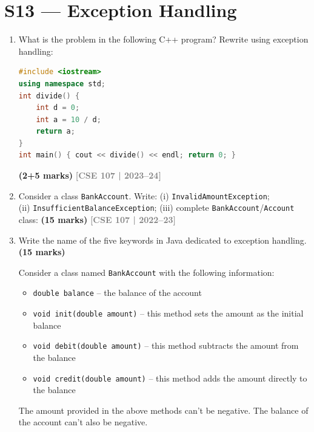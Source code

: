 \documentclass[12pt,a3paper]{article}
\newcommand{\yr}[1]{\hfill\textcolor{gray}{\small\textbf{[#1]}}}
\newcommand{\mk}[1]{\textcolor{orange!70!black}{\small\textbf{(#1 marks)}}}
\begin{document}
\section{S13 --- Exception Handling}

\begin{enumerate}
\item What is the problem in the following C++ program? Rewrite using exception handling:
\begin{lstlisting}[language=C++]
#include <iostream>
using namespace std;
int divide() {
    int d = 0;
    int a = 10 / d;
    return a;
}
int main() { cout << divide() << endl; return 0; }
\end{lstlisting}
\mk{2+5}
\yr{CSE 107 | 2023--24}







\item Consider a class \texttt{BankAccount}. Write: (i) \texttt{InvalidAmountException};\\ (ii) \texttt{InsufficientBalanceException}; (iii) complete \texttt{BankAccount}/\texttt{Account} class: \mk{15}
\yr{CSE 107 | 2022--23}






\item Write the name of the five keywords in Java dedicated to exception handling. \mk{15}

Consider a class named \texttt{BankAccount} with the following information:
\begin{itemize}
    \item \texttt{double balance} -- the balance of the account
    \item \texttt{void init(double amount)} -- this method sets the amount as the initial balance
    \item \texttt{void debit(double amount)} -- this method subtracts the amount from the balance
    \item \texttt{void credit(double amount)} -- this method adds the amount directly to the balance
\end{itemize}
The amount provided in the above methods can't be negative. The balance of the account can't also be negative.


\end{enumerate}
\end{document}
